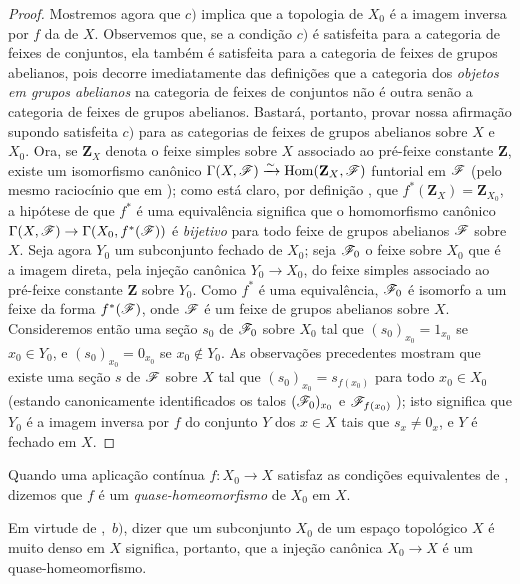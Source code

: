\begin{proof}
Mostremos agora que $c)$ implica que a topologia de $X_0$ é a imagem inversa por $f$ da de $X$.
Observemos que, se a condição $c)$ é satisfeita para a categoria de feixes de conjuntos, ela também é satisfeita para a categoria de feixes de grupos abelianos, pois decorre imediatamente das definições  que a categoria dos \emph{objetos em grupos abelianos} na categoria de feixes de conjuntos não é outra senão a categoria de feixes de grupos abelianos.
Bastará, portanto, provar nossa afirmação supondo satisfeita $c)$ para as categorias de feixes de grupos abelianos sobre $X$ e $X_0$.
Ora, se $\mathbf{Z}_X$ denota o feixe simples sobre $X$ associado ao pré-feixe constante $\mathbf{Z}$, existe um isomorfismo canônico $\Gamma(X,\mathscr{F})\xrightarrow{\sim}\operatorname{Hom}(\mathbf{Z}_X,\mathscr{F})$ funtorial em $\mathscr{F}$ (pelo mesmo raciocínio que em ); como está claro, por definição , que $f^*(\mathbf{Z}_X)=\mathbf{Z}_{X_0}$, a hipótese de que $f^*$ é uma equivalência significa que o homomorfismo canônico $\Gamma(X,\sh{F})\to\Gamma(X_0,f^*(\sh{F}))$ é \emph{bijetivo} para todo feixe de grupos abelianos $\mathscr{F}$ sobre $X$.
Seja agora $Y_0$ um subconjunto fechado de $X_0$; seja $\mathscr{F}_0$ o feixe sobre $X_0$ que é a imagem direta, pela injeção canônica $Y_0\to X_0$, do feixe simples associado ao pré-feixe constante $\mathbf{Z}$ sobre $Y_0$.
Como $f^*$ é uma equivalência, $\mathscr{F}_0$ é isomorfo a um feixe da forma $f^*(\mathscr{F})$, onde $\mathscr{F}$ é um feixe de grupos abelianos sobre $X$.
Consideremos então uma seção $s_0$ de $\mathscr{F}_0$ sobre $X_0$ tal que $(s_0)_{x_0}=1_{x_0}$ se $x_0\in Y_0$, e $(s_0)_{x_0}=0_{x_0}$ se $x_0\notin Y_0$.
As observações precedentes mostram que existe uma seção $s$ de $\mathscr{F}$ sobre $X$ tal que $(s_0)_{x_0}=s_{f(x_0)}$ para todo $x_0\in X_0$ (estando canonicamente identificados os talos $(\mathscr{F}_0)_{x_0}$ e $\mathscr{F}_{f(x_0)}$ ); isto significa que $Y_0$ é a imagem inversa por $f$ do conjunto $Y$ dos $x\in X$ tais que $s_x\neq 0_x$, e $Y$ é fechado em $X$.
\end{proof}

\begin{definition}[10.2.2]
\label{IV.10.2.2}
Quando uma aplicação contínua $f:X_0\to X$ satisfaz as condições equivalentes de , dizemos que $f$ é um \emph{quase-homeomorfismo} de $X_0$ em $X$.
\end{definition}

Em virtude de ,~$b)$, dizer que um subconjunto $X_0$ de um espaço topológico $X$ é muito denso em $X$ significa, portanto, que a injeção canônica $X_0\to X$ é um quase-homeomorfismo.

